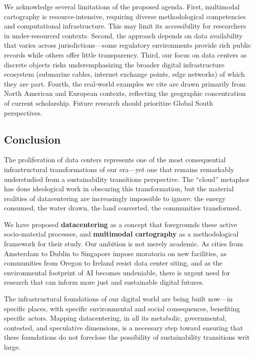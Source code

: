 \documentclass[review]{elsarticle}
\begin{document}
We acknowledge several limitations of the proposed agenda. First, multimodal cartography is resource-intensive, requiring diverse methodological competencies and computational infrastructure. This may limit its accessibility for researchers in under-resourced contexts. Second, the approach depends on data availability that varies across jurisdictions---some regulatory environments provide rich public records while others offer little transparency. Third, our focus on data centers as discrete objects risks underemphasizing the broader digital infrastructure ecosystem (submarine cables, internet exchange points, edge networks) of which they are part. Fourth, the real-world examples we cite are drawn primarily from North American and European contexts, reflecting the geographic concentration of current scholarship. Future research should prioritize Global South perspectives.

\subsection{Conclusion}

The proliferation of data centers represents one of the most consequential infrastructural transformations of our era---yet one that remains remarkably understudied from a sustainability transitions perspective. The ``cloud'' metaphor has done ideological work in obscuring this transformation, but the material realities of datacentering are increasingly impossible to ignore: the energy consumed, the water drawn, the land converted, the communities transformed.

We have proposed \textbf{datacentering} as a concept that foregrounds these active socio-material processes, and \textbf{multimodal cartography} as a methodological framework for their study. Our ambition is not merely academic. As cities from Amsterdam to Dublin to Singapore impose moratoria on new facilities, as communities from Oregon to Ireland resist data center siting, and as the environmental footprint of AI becomes undeniable, there is urgent need for research that can inform more just and sustainable digital futures.

The infrastructural foundations of our digital world are being built now---in specific places, with specific environmental and social consequences, benefiting specific actors. Mapping datacentering, in all its metabolic, governmental, contested, and speculative dimensions, is a necessary step toward ensuring that these foundations do not foreclose the possibility of sustainability transitions writ large.
\end{document}
